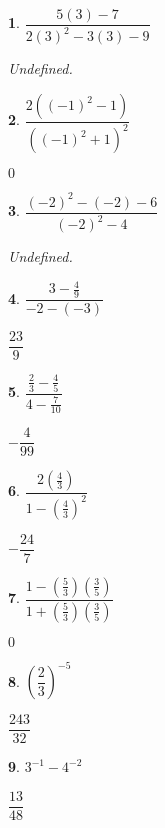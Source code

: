 \documentclass{amsbook}
\newtheorem{exc}{}
\newenvironment{ex}{\begin{exc}\normalfont}{\end{exc}}
\numberwithin{section}{chapter}
\numberwithin{equation}{chapter}
\begin{document}
\begin{multicols}{3}
\begin{ex}
	$\dfrac{5(3) - 7}{2(3)^2-3(3)-9}$
	\begin{sol}
		 Undefined.
	\end{sol}
\end{ex}

\begin{ex}
	$\dfrac{2((-1)^2-1)}{((-1)^2+1)^2}$
	\begin{sol}
	$0$	
	\end{sol}
\end{ex}

\begin{ex}
	$\dfrac{(-2)^2 - (-2) - 6}{(-2)^2 - 4}$
	\begin{sol}
		Undefined.
	\end{sol}
\end{ex}

\begin{ex}
	$\dfrac{3 - \frac{4}{9}}{-2 - (-3)}$
	\begin{sol}
		$\dfrac{23}{9}$
	\end{sol}
\end{ex}

\begin{ex}
	$\dfrac{\frac{2}{3} - \frac{4}{5}}{4 - \frac{7}{10}}$
	\begin{sol}
		$-\dfrac{4}{99}$
	\end{sol}
\end{ex}

\begin{ex}
	$\dfrac{2\left(\frac{4}{3}\right)}{1 - \left(\frac{4}{3}\right)^2}$
	\begin{sol}
	$-\dfrac{24}{7}$	
	\end{sol}
\end{ex}

\begin{ex}
	$\dfrac{1 - \left(\frac{5}{3}\right)\left(\frac{3}{5}\right)}{1 + \left(\frac{5}{3}\right)\left(\frac{3}{5}\right)}$
	\begin{sol}
	$0$	
	\end{sol}
\end{ex}

\begin{ex}
	$\left(\dfrac{2}{3}\right)^{-5}$
	\begin{sol}
		$\dfrac{243}{32}$
	\end{sol}
\end{ex}

\begin{ex}
	$3^{-1} - 4^{-2}$
	\begin{sol}
		$\dfrac{13}{48}$
	\end{sol}
\end{ex}


\end{multicols}
\end{document}
